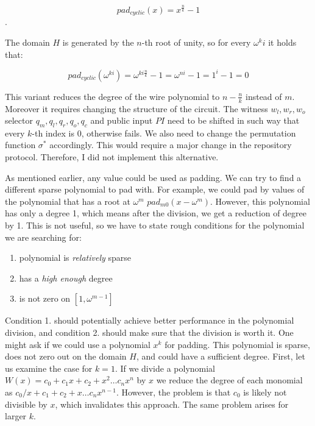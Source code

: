 \begin{equation}
    pad_{cyclic}(x) = x^{\frac{n}{k}} - 1
\end{equation}.

The domain $H$ is generated by the $n$-th root of unity, so for every $\omega^ki$ it holds that:

$$pad_{cyclic}(\omega^{ki}) = \omega^{ki \frac{n}{k}} -1 = \omega^{ni} - 1 = 1^i - 1 = 0$$

This variant reduces the degree of the wire polynomial to $n - \frac{n}{k}$ instead of $m$. Moreover it requires changing the structure of the circuit. The witness $w_l, w_r, w_o$ selector $q_m, q_l, q_r, q_o, q_c$ and public input $PI$ need to be shifted in such way that every $k$-th index is 0, otherwise  fails. We also need to change the permutation function $\sigma^*$ accordingly. This would require a major change in the repository protocol. Therefore, I did not implement this alternative.

As mentioned earlier, any value could be used as padding. We can try to find a different sparse polynomial to pad with. For example, we could pad by values of the polynomial that has a root at $\omega^m$ $pad_{m0}(x - \omega^m)$. However, this polynomial has only a degree 1, which means after the division, we get a reduction of degree by 1. This is not useful, so we have to state rough conditions for the polynomial we are searching for:

\begin{enumerate}
    \item polynomial is \textit{relatively} sparse
    \item has a \textit{high enough} degree
    \item is not zero on $[1, \omega^{m-1}]$
\end{enumerate}

Condition 1. should potentially achieve better performance in the polynomial division, and condition 2. should make sure that the division is worth it. One might ask if we could use a polynomial $x^{k}$ for padding. This polynomial is sparse, does not zero out on the domain $H$, and could have a sufficient degree. First, let us examine the case for $k=1$. If we divide a polynomial $W(x) = c_0 + c_1 x + c_2 + x^2 \ldots c_n x^n$ by $x$ we reduce the degree of each monomial as $c_0/x + c_1 + c_2 + x \ldots c_n x^{n-1}$. However, the problem is that $c_0$ is likely not divisible by $x$, which invalidates this approach. The same problem arises for larger $k$.

